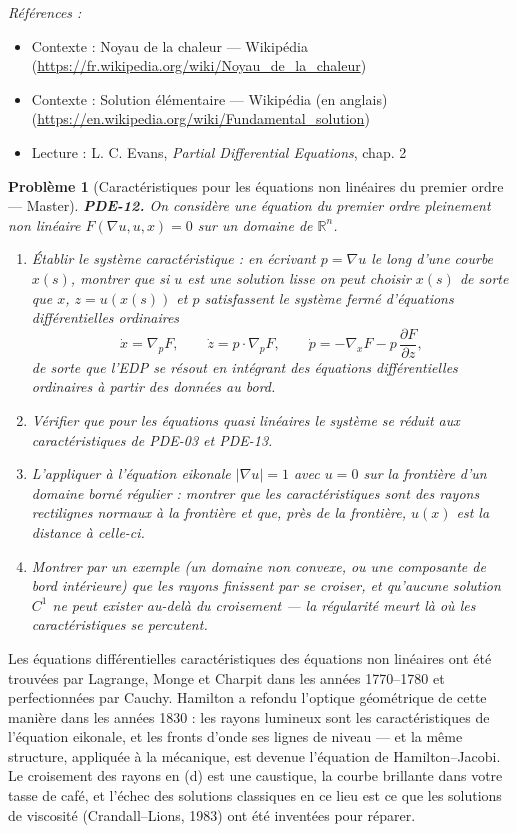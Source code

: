 \documentclass[11pt]{article}
\newtheorem{problem}{Problème}
\newenvironment{refs}{\par\small\noindent\emph{Références :}\begin{itemize}\setlength\itemsep{0pt}}{\end{itemize}\normalsize}
\begin{document}
\begin{refs}
\item Contexte : Noyau de la chaleur --- Wikipédia (\url{https://fr.wikipedia.org/wiki/Noyau_de_la_chaleur})
\item Contexte : Solution élémentaire --- Wikipédia (en anglais) (\url{https://en.wikipedia.org/wiki/Fundamental_solution})
\item Lecture : L. C. Evans, \textit{Partial Differential Equations}, chap. 2
\end{refs}

\bigskip

\begin{problem}[{Caractéristiques pour les équations non linéaires du premier ordre --- Master}]
\textbf{PDE-12.} On considère une équation du premier ordre pleinement
non linéaire $F(\nabla u, u, x) = 0$ sur un domaine de $\mathbb{R}^n$.
\begin{enumerate}
\item[(a)] Établir le
système caractéristique : en écrivant $p = \nabla u$ le long d'une courbe $x(s)$, montrer que
si $u$ est une solution lisse on peut choisir $x(s)$ de sorte que $x$, $z = u(x(s))$
et $p$ satisfassent le système fermé d'équations différentielles ordinaires
\[ \dot{x} = \nabla_p F, \qquad \dot{z} = p \cdot \nabla_p F, \qquad
\dot{p} = -\nabla_x F - p\,\frac{\partial F}{\partial z}, \]
de sorte que l'EDP se résout en intégrant des équations différentielles ordinaires à partir des
données au bord.
\item[(b)] Vérifier que pour les
équations quasi linéaires le système se réduit aux caractéristiques de PDE-03 et
PDE-13.
\item[(c)] L'appliquer à l'équation eikonale $|\nabla u| = 1$ avec $u = 0$ sur
la frontière d'un domaine borné régulier : montrer que les caractéristiques sont des rayons
rectilignes normaux à la frontière et que, près de la frontière, $u(x)$ est la distance à
celle-ci.
\item[(d)] Montrer par un exemple (un domaine non convexe, ou une composante de bord
intérieure) que les rayons finissent par se croiser, et qu'aucune solution $C^1$ ne peut exister
au-delà du croisement --- la régularité meurt là où les caractéristiques se percutent.
\end{enumerate}

\end{problem}

\noindent Les équations différentielles caractéristiques des équations non linéaires ont
été trouvées par Lagrange, Monge et Charpit dans les années 1770--1780 et perfectionnées par Cauchy.
Hamilton a refondu l'optique géométrique de cette manière dans les années 1830 : les rayons
lumineux sont les caractéristiques de l'équation eikonale, et les fronts d'onde ses lignes de
niveau --- et la même structure, appliquée à la mécanique, est devenue l'équation de
Hamilton--Jacobi. Le croisement des rayons en (d) est une caustique, la courbe brillante dans votre
tasse de café, et l'échec des solutions classiques en ce lieu est ce que les solutions de
viscosité (Crandall--Lions, 1983) ont été inventées pour réparer.
\end{document}
